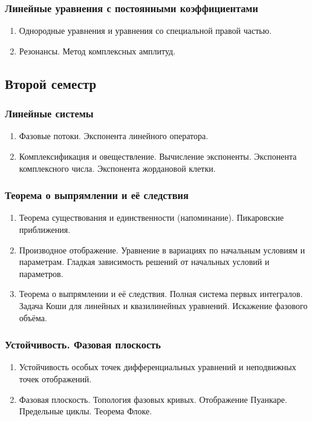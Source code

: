 \documentclass[a4paper]{article}
\begin{document}
\subsubsection{Линейные уравнения с постоянными коэффициентами}
\begin{enumerate}
\setlength\itemsep{-1.5mm}
\item Однородные уравнения и уравнения со специальной правой частью.
\item Резонансы. Метод комплексных амплитуд.
\end{enumerate}

\subsection{Второй семестр}

\subsubsection{Линейные системы}
\begin{enumerate}
\setlength\itemsep{-1.5mm}
\item Фазовые потоки. Экспонента линейного оператора.
\item Комплексификация и овеществление. Вычисление экспоненты. Экспонента комплексного числа. Экспонента жордановой клетки.
\end{enumerate}

\subsubsection{Теорема о выпрямлении и её следствия}
\begin{enumerate}
\setlength\itemsep{-1.5mm}
\item Теорема существования и единственности (напоминание). Пикаровские приближения.
\item Производное отображение. Уравнение в вариациях по начальным условиям и параметрам.
Гладкая зависимость решений от начальных условий и параметров.
\item Теорема о выпрямлении и её следствия. Полная система первых интегралов. Задача Коши для
линейных и квазилинейных уравнений. Искажение фазового объёма.
\end{enumerate}

\subsubsection{Устойчивость. Фазовая плоскость}
\begin{enumerate}
\setlength\itemsep{-1.5mm}
\item Устойчивость особых точек дифференциальных уравнений и неподвижных точек отображений.
\item Фазовая плоскость. Топология фазовых кривых. Отображение Пуанкаре. Предельные циклы. Теорема Флоке.
\end{enumerate}
\end{document}
